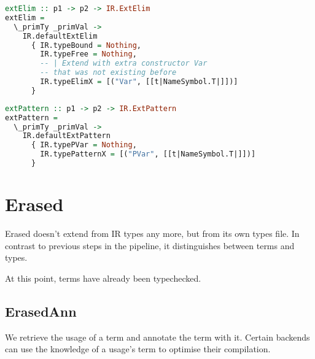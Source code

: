 \documentclass[acmsmall]{acmart}
\numberwithin{figure}{subsection}
\begin{document}
\begin{lstlisting}[language=haskell]
extElim :: p1 -> p2 -> IR.ExtElim
extElim =
  \_primTy _primVal ->
    IR.defaultExtElim
      { IR.typeBound = Nothing,
        IR.typeFree = Nothing,
        -- | Extend with extra constructor Var 
        -- that was not existing before
        IR.typeElimX = [("Var", [[t|NameSymbol.T|]])]
      }
\end{lstlisting}


\begin{lstlisting}[language=haskell]
extPattern :: p1 -> p2 -> IR.ExtPattern
extPattern =
  \_primTy _primVal ->
    IR.defaultExtPattern
      { IR.typePVar = Nothing,
        IR.typePatternX = [("PVar", [[t|NameSymbol.T|]])]
      }
\end{lstlisting}

\section{Erased}


Erased doesn't extend from IR types any more, but from its own types file. In contrast to previous steps in the pipeline, it distinguishes between terms and types.

At this point, terms have already been typechecked.

\subsection{ErasedAnn}

We retrieve the usage of a term and annotate the term with it. Certain backends can use the knowledge of a usage's term to optimise their compilation.
\end{document}
